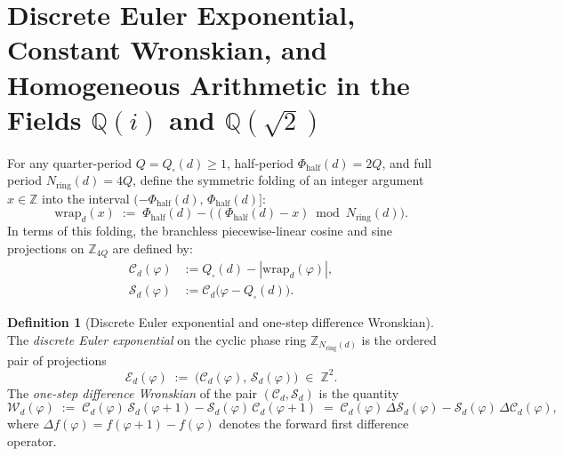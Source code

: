 \documentclass[11pt,a4paper]{article}
\theoremstyle{plain}
\theoremstyle{definition}
\newtheorem{definition}[theorem]{Definition}
\begin{document}
\section{Discrete Euler Exponential, Constant Wronskian, and Homogeneous Arithmetic in the Fields \texorpdfstring{$\mathbb{Q}(i)$ and $\mathbb{Q}(\sqrt{2})$}{Q(i) and Q(sqrt 2)}}
\label{sec:wronskian-euler}

For any quarter-period $Q = Q_\square(d) \ge 1$, half-period $\Phi_{\mathrm{half}}(d) = 2Q$, and full period $N_{\mathrm{ring}}(d) = 4Q$, define the symmetric folding of an integer argument $x \in \mathbb{Z}$ into the interval $(-\Phi_{\mathrm{half}}(d),\, \Phi_{\mathrm{half}}(d)]$:
\begin{equation}
  \label{eq:wrap-ring}
  \mathrm{wrap}_d(x) \;:=\; \Phi_{\mathrm{half}}(d) - \bigl((\Phi_{\mathrm{half}}(d) - x) \bmod N_{\mathrm{ring}}(d)\bigr).
\end{equation}
In terms of this folding, the branchless piecewise-linear cosine and sine projections on $\mathbb{Z}_{4Q}$ are defined by:
\begin{align}
  \mathcal{C}_d(\varphi) &:= Q_\square(d) - |\mathrm{wrap}_d(\varphi)|, \label{eq:proj-c} \\
  \mathcal{S}_d(\varphi) &:= \mathcal{C}_d\bigl(\varphi - Q_\square(d)\bigr). \label{eq:proj-s}
\end{align}

\begin{definition}[Discrete Euler exponential and one-step difference Wronskian]
\label{def:euler-exp-wronskian}
The \emph{discrete Euler exponential} on the cyclic phase ring $\mathbb{Z}_{N_{\mathrm{ring}}(d)}$ is the ordered pair of projections
\begin{equation}
  \label{eq:euler-exp-pair}
  \mathcal{E}_d(\varphi) \;:=\; \bigl(\mathcal{C}_d(\varphi),\, \mathcal{S}_d(\varphi)\bigr) \;\in\; \mathbb{Z}^2.
\end{equation}
The \emph{one-step difference Wronskian} of the pair $(\mathcal{C}_d, \mathcal{S}_d)$ is the quantity
\begin{equation}
  \label{eq:rotator-wronskian}
  \mathcal{W}_d(\varphi) \;:=\; \mathcal{C}_d(\varphi)\,\mathcal{S}_d(\varphi+1) - \mathcal{S}_d(\varphi)\,\mathcal{C}_d(\varphi+1)
  \;=\; \mathcal{C}_d(\varphi)\,\Delta\mathcal{S}_d(\varphi) - \mathcal{S}_d(\varphi)\,\Delta\mathcal{C}_d(\varphi),
\end{equation}
where $\Delta f(\varphi) = f(\varphi+1) - f(\varphi)$ denotes the forward first difference operator.
\end{definition}
\end{document}
